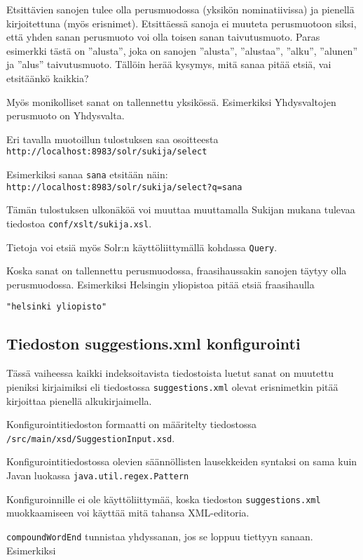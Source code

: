 \documentclass[12pt]{article}
\begin{document}
Etsittävien sanojen tulee olla perusmuodossa (yksikön nominatiivissa)
ja pienellä kirjoitettuna (myös erisnimet). Etsittäessä sanoja ei
muuteta perusmuotoon siksi, että yhden sanan perusmuoto voi olla
toisen sanan taivutusmuoto. Paras esimerkki tästä on ''alusta'', joka
on sanojen ''alusta'', ''alustaa'', ''alku'', ''alunen'' ja ''alus''
taivutusmuoto. Tällöin herää kysymys, mitä sanaa pitää etsiä, vai
etsitäänkö kaikkia?

Myös monikolliset sanat on tallennettu yksikössä. Esimerkiksi
Yhdysvaltojen perusmuoto on Yhdysvalta.


Eri tavalla muotoillun tulostuksen saa osoitteesta
\verb=http://localhost:8983/solr/sukija/select=

Esimerkiksi sanaa \verb=sana= etsitään näin:
\verb|http://localhost:8983/solr/sukija/select?q=sana|

Tämän tulostuksen ulkonäköä voi muuttaa muuttamalla Sukijan mukana
tulevaa tiedostoa \verb=conf/xslt/sukija.xsl=.

Tietoja voi etsiä myös Solr:n käyttöliittymällä kohdassa \verb|Query|.


Koska sanat on tallennettu perusmuodossa, fraasihaussakin sanojen
täytyy olla perusmuodossa. Esimerkiksi Helsingin yliopistoa pitää
etsiä fraasihaulla

\verb="helsinki yliopisto"=


\subsection*{Tiedoston suggestions.xml konfigurointi}

Tässä vaiheessa kaikki indeksoitavista tiedostoista luetut sanat on
muutettu pieniksi kirjaimiksi eli tiedostossa
\verb|suggestions.xml| olevat erisnimetkin pitää kirjoittaa
pienellä alkukirjaimella.

Konfigurointitiedoston formaatti on määritelty tiedostossa
\verb=/src/main/xsd/SuggestionInput.xsd=.

Konfigurointitiedostossa olevien säännöllisten lausekkeiden syntaksi on
sama kuin Javan luokassa \verb=java.util.regex.Pattern=

Konfiguroinnille ei ole käyttöliittymää, koska tiedoston
\verb=suggestions.xml= muokkaamiseen voi käyttää mitä tahansa
XML-editoria.




\bigskip
\verb|compoundWordEnd| tunnistaa yhdyssanan, jos se loppuu tiettyyn sanaan.
Esimerkiksi
\end{document}
